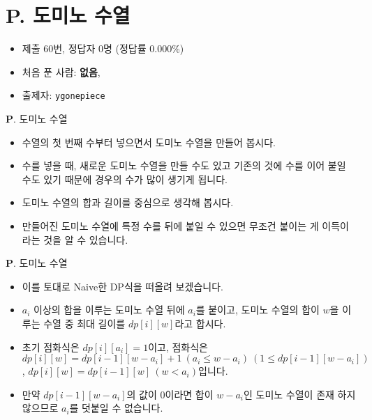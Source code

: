 \section{P. 도미노 수열}

\begin{frame} %
    \begin{itemize}
        \item 제출 60번, 정답자 0명 (정답률 0.000\%)
        \item 처음 푼 사람: \textbf{없음},
        \item 출제자: \texttt{ygonepiece}
    \end{itemize}
\end{frame}

\begin{frame}{\textbf{P}. 도미노 수열}
    \begin{itemize}
        \item 수열의 첫 번째 수부터 넣으면서 도미노 수열을 만들어 봅시다.
        \item 수를 넣을 때, 새로운 도미노 수열을 만들 수도 있고 기존의 것에 수를 이어 붙일 수도 있기 때문에 경우의 수가 많이 생기게 됩니다.
        \item 도미노 수열의 합과 길이를 중심으로 생각해 봅시다.
        \item 만들어진 도미노 수열에 특정 수를 뒤에 붙일 수 있으면 무조건 붙이는 게 이득이라는 것을 알 수 있습니다.
    \end{itemize}
\end{frame}

\begin{frame}{\textbf{P}. 도미노 수열}
    \begin{itemize}
        
        \item 이를 토대로 Naive한 DP식을 떠올려 보겠습니다.
        \item $a_i$ 이상의 합을 이루는 도미노 수열 뒤에 $a_i$를 붙이고, 도미노 수열의 합이 $w$을 이루는 수열 중 최대 길이를 $dp[i][w]$라고 합시다.
        \item 초기 점화식은 $dp[i][a_i] = 1$이고, 점화식은 $dp[i][w] = dp[i-1][w-a_i] + 1 \ (a_i \leq w-a_i) \ (1 \le dp[i-1][w-a_i])$, $dp[i][w] = dp[i-1][w] \ (w < a_i)$입니다.
        \item 만약 $dp[i-1][w-a_i]$의 값이 0이라면 합이 $w - a_i$인 도미노 수열이 존재 하지 않으므로 $a_i$를 덧붙일 수 없습니다.
    \end{itemize}
\end{frame}

